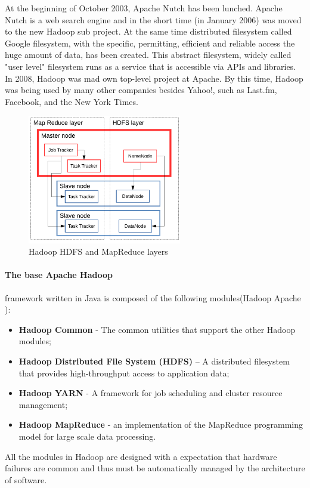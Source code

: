 \documentclass[a4paper,12pt,oneside]{report}
\begin{document}
At the beginning of October 2003, Apache Nutch\cite{nutch_web} has been lunched. Apache Nutch is a  web search engine and in the short time (in January 2006) was moved to the new Hadoop sub project.
At the same time  distributed filesystem called Google
filesystem\cite{google_fs}, with the specific, permitting, efficient and reliable access
the huge amount of data, has been created. This abstract filesystem, widely called "user level"
filesystem runs as a service that is accessible via APIs and libraries. 
In 2008, Hadoop was mad own top-level project at Apache.\cite{hadoop_web_news} By this time, Hadoop was being used by many
other companies besides Yahoo!, such as Last.fm, Facebook, and the New York Times. 

 \begin{figure}[!htbp]
    \centering
    \includegraphics[width=0.6\textwidth]{./img/schema2.pdf}
    \caption[Hadoop architecture2]{\centering Hadoop HDFS and MapReduce layers}
 \end{figure} 
 
 
 
\paragraph*{The base Apache Hadoop}framework written in Java is composed of the following modules(Hadoop Apache \cite{hadoop_web}):
\begin{itemize}
\item \textbf{Hadoop Common} - The common utilities that support the other Hadoop modules;
\item \textbf{Hadoop Distributed File System (HDFS)} – A distributed filesystem that provides
 high-throughput access to application data;
\item \textbf{Hadoop YARN} - A framework for job scheduling and cluster resource management;
\item \textbf{Hadoop MapReduce} - an implementation of the MapReduce programming model 
for large scale data processing.
\end{itemize}
All the modules in Hadoop are designed with a expectation that hardware failures  are common and thus 
must be automatically managed by the architecture of  software.
\end{document}
